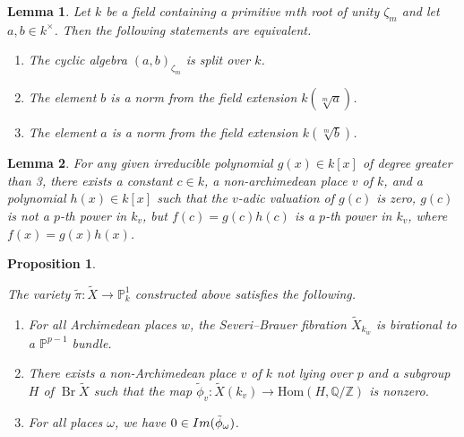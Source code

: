 \documentclass[10pt,a4paper]{amsart}
\newtheorem{lemma}{Lemma}
\newtheorem{proposition}{Proposition}
\DeclareMathOperator{\Br}{Br}
\newcommand{\im}{{\rm Im}}
\begin{document}
    \begin{lemma}\label{split algebra} Let $k$ be a field containing a primitive $m$th root of unity $\zeta_m$ and let $a,b \in k^\times$. Then the following statements are equivalent.
    \begin{enumerate}[label=\arabic*.]
		\item The cyclic algebra $(a,b)_{\zeta_m}$ is split over $k$.
		\item The element $b$ is a norm from the field extension $k(\sqrt[m]{a})$.
		\item The element $a$ is a norm from the field extension $k(\sqrt[m]{b})$.
    \end{enumerate}
    \end{lemma}

\begin{lemma}\label{required polynomial}
    For any given irreducible polynomial $g(x)\in k[x]$ of degree greater than 3, there exists a constant $c\in k$, a non-archimedean place $v$ of $k$, and a polynomial $h(x)\in k[x]$ such that the $v$-adic valuation of $g(c)$ is zero, $g(c)$ is not a $p$-th power in $k_v$, but $f(c)=g(c)h(c)$ is a $p$-th power in $k_v$, where $f(x)=g(x)h(x)$.
\end{lemma}

	\begin{proposition}\label{Main lemma}
		
		
		The variety $\tilde{\pi} : \tilde{X} \to \mathbb{P}_k^1$ constructed above satisfies the following.
		
		\begin{enumerate}[label=\arabic*.]
			\item For all Archimedean places $w$, the Severi--Brauer fibration $\tilde{X}_{k_w}$ is birational to a $\mathbb{P}^{p-1}$ bundle.
			\item There exists a non-Archimedean place $v$ of $k$ not lying over $p$ and a subgroup $H$ of $\Br\tilde{X}$ such that the map $\tilde{\phi}_{v} : \tilde{X}(k_{v}) \to \mathrm{Hom}(H, \mathbb{Q}/\mathbb{Z})$ is nonzero.
			\item For all places $\omega$, we have $0 \in \im (\tilde{\phi}_{\omega})$.	
		\end{enumerate}
		
	\end{proposition}
\end{document}
